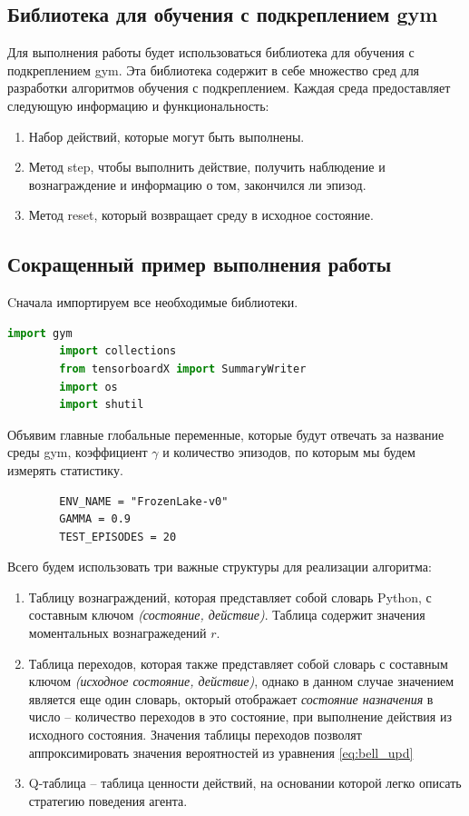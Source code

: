 \documentclass[fleqn, a4paper, 14pt]{article}
\begin{document}
	\subsection{Библиотека для обучения с подкреплением gym}
	
	Для выполнения работы будет использоваться библиотека для обучения с подкреплением gym. Эта библиотека содержит в себе множество сред для разработки алгоритмов обучения с подкреплением. 
	Каждая среда предоставляет следующую информацию и функциональность:
	\begin{enumerate}
	\item Набор действий, которые могут быть выполнены.
	\item Метод step, чтобы выполнить действие, получить наблюдение и вознаграждение и информацию о том, закончился ли эпизод.
	\item Метод reset, который возвращает среду в исходное состояние.
	\end{enumerate}
	 
	\subsection{Сокращенный пример выполнения работы}
	Cначала импортируем все необходимые библиотеки. 
	\begin{lstlisting}[language=Python]
		import gym
		import collections
		from tensorboardX import SummaryWriter
		import os
		import shutil
	\end{lstlisting}
	Объявим главные глобальные переменные, которые будут отвечать за название среды gym, коэффициент $ \gamma $ и количество эпизодов, по которым мы будем измерять статистику.
	\begin{lstlisting}	
		ENV_NAME = "FrozenLake-v0"
		GAMMA = 0.9
		TEST_EPISODES = 20
	\end{lstlisting}
	
	Всего будем использовать три важные структуры для реализации алгоритма:
	\begin{enumerate}
	\item Таблицу вознаграждений, которая представляет собой словарь Python, с составным ключом \textit{(состояние, действие)}. Таблица содержит значения моментальных вознагражедений $ r $.
	\item Таблица переходов, которая также представляет собой словарь с составным ключом \textit{(исходное состояние, действие)}, однако в данном случае значением является еще один словарь, окторый отображает \textit{состояние назначения} в число -- количество переходов в это состояние, при выполнение действия из исходного состояния. Значения таблицы переходов позволят аппроксимировать значения вероятностей из уравнения \eqref{eq:bell_upd}
	\item Q-таблица -- таблица ценности действий, на основании которой легко описать стратегию поведения агента.
	\end{enumerate}
	
\end{document}

